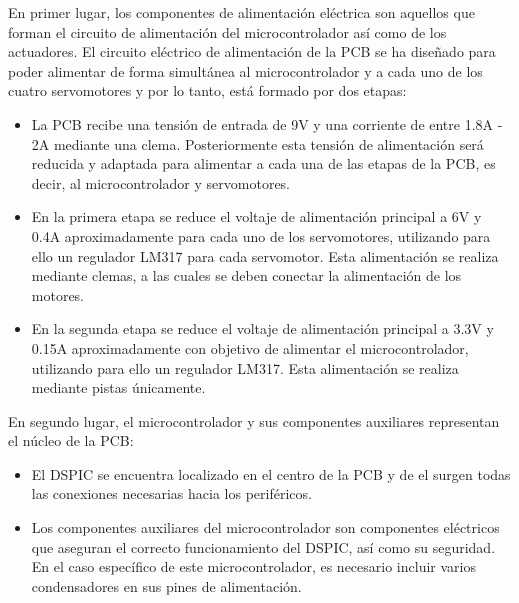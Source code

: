 En primer lugar, los componentes de alimentación eléctrica son aquellos que forman el circuito de alimentación del microcontrolador así como de los actuadores. El circuito eléctrico de alimentación de la PCB se ha diseñado para poder alimentar de forma simultánea al microcontrolador y a cada uno de los cuatro servomotores y por lo tanto, está formado por dos etapas:
\begin{itemize}
    \item La PCB recibe una tensión de entrada de 9V y una corriente de entre 1.8A - 2A mediante una clema. Posteriormente esta tensión de alimentación será reducida y adaptada para alimentar a cada una de las etapas de la PCB, es decir, al microcontrolador y servomotores.
    \item En la primera etapa se reduce el voltaje de alimentación principal a 6V y 0.4A aproximadamente para cada uno de los servomotores, utilizando para ello un regulador LM317 para cada servomotor. Esta alimentación se realiza mediante clemas, a las cuales se deben conectar la alimentación de los motores.
    \item En la segunda etapa se reduce el voltaje de alimentación principal a 3.3V y 0.15A aproximadamente con objetivo de alimentar el microcontrolador, utilizando para  ello un regulador LM317. Esta alimentación se realiza mediante pistas únicamente.
\end{itemize}

En segundo lugar, el microcontrolador y sus componentes auxiliares representan el núcleo de la PCB:
\begin{itemize}
    \item El DSPIC se encuentra localizado en el centro de la PCB y de el surgen todas las conexiones necesarias hacia los periféricos.
    \item Los componentes auxiliares del microcontrolador son componentes eléctricos que aseguran el correcto funcionamiento del DSPIC, así como su seguridad. En el caso específico de este microcontrolador, es necesario incluir varios condensadores en sus pines de alimentación.
\end{itemize}

